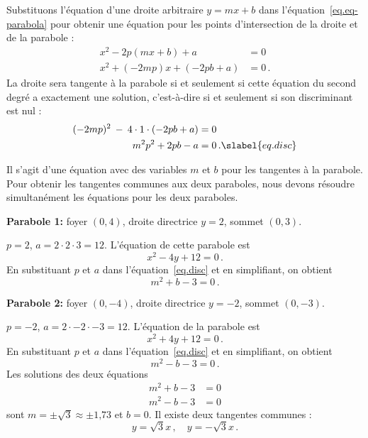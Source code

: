 Substituons l'équation d'une droite arbitraire $y=mx+b$ dans l'équation~\ref{eq.eq-parabola} pour obtenir une équation pour les points d'intersection de la droite et de la parabole :
\begin{align*}
x^2-2p(mx+b)+a&=0\\
x^2+(-2mp)x+(-2pb+a)&=0\,.
\end{align*}
La droite sera tangente à la parabole si et seulement si cette équation du second degré a exactement une solution, c'est-à-dire si et seulement si son discriminant est nul :
\begin{subequations}
\begin{align}
(-2mp)^2\:-\:4\cdot 1\cdot (-2pb+a)&=0\\
m^2p^2+2pb-a&=0\,.\slabel{eq.disc}
\end{align}
\end{subequations}

Il s'agit d'une équation avec des variables $m$ et $b$ pour les tangentes à la parabole. Pour obtenir les tangentes communes aux deux paraboles, nous devons résoudre simultanément les équations pour les deux paraboles.



\begin{example}\mbox{}

\noindent\textbf{Parabole 1:} foyer $(0,4)$, droite directrice $y=2$, sommet $(0,3)$.

\noindent{}$p=2$, $a=2\cdot 2\cdot 3=12$. L'équation de cette parabole est 
\[
x^2-4y +12=0\,.
\]
En substituant $p$ et $a$ dans l'équation~\ref{eq.disc} et en simplifiant, on obtient 
\[
m^2+b-3=0\,.
\]

\noindent\textbf{Parabole 2:} foyer $(0,-4)$, droite directrice $y=-2$, sommet $(0,-3)$.

\noindent{}$p=-2$, $a=2\cdot -2\cdot -3=12$. L'équation de la parabole est 
\[
x^2+4y+12=0\,.
\]
En substituant $p$ et $a$ dans l'équation~\ref{eq.disc} et en simplifiant, on obtient 
\[
m^2-b-3=0\,.
\]
Les solutions des deux équations 
\begin{align*}
m^2+b-3&=0\\
m^2-b-3&=0
\end{align*}
sont $m=\pm\sqrt{3}\approx \pm \mbox{1,73}$ et $b=0$. Il existe deux tangentes communes :
\[
y=\sqrt{3}x\,,\quad y=-\sqrt{3}x\,.
\]
\end{example}

